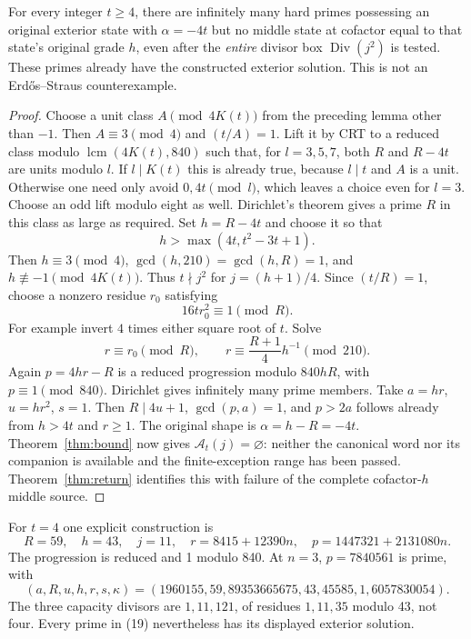 \begin{theorem}\label{thm:obstruct}
For every integer $t\ge4$, there are infinitely many hard primes possessing an
original exterior state with $\alpha=-4t$ but no middle state at cofactor equal
to that state's original grade $h$, even after the \emph{entire} divisor box
$\operatorname{Div}(j^2)$ is tested. These primes already have the constructed
exterior solution. This is not an Erd\H{o}s--Straus counterexample.
\end{theorem}
\begin{proof}
Choose a unit class $A\pmod{4K(t)}$ from the preceding lemma other than $-1$.
Then $A\equiv3\pmod4$ and $(t/A)=1$. Lift it by CRT to a reduced class modulo
$\operatorname{lcm}(4K(t),840)$ such that, for $l=3,5,7$, both $R$ and
$R-4t$ are units modulo $l$. If $l\mid K(t)$ this is already true, because
$l\mid t$ and $A$ is a unit. Otherwise one need only avoid $0,4t\pmod l$,
which leaves a choice even for $l=3$. Choose an odd lift modulo eight as well.
Dirichlet's theorem gives a prime $R$ in this class as large as required.
Set $h=R-4t$ and choose it so that
\[
 h>\max(4t,t^2-3t+1).
\]
Then $h\equiv3\pmod4$, $\gcd(h,210)=\gcd(h,R)=1$, and
$h\not\equiv-1\pmod{4K(t)}$. Thus $t\nmid j^2$ for $j=(h+1)/4$.
Since $(t/R)=1$, choose a nonzero residue $r_0$ satisfying
\[
 16tr_0^2\equiv1\pmod R.
\]
For example invert $4$ times either square root of $t$. Solve
\[
 r\equiv r_0\pmod R,\qquad
 r\equiv\frac{R+1}{4}h^{-1}\pmod{210}.
\]
Again $p=4hr-R$ is a reduced progression modulo $840hR$, with $p\equiv1\pmod{840}$.
Dirichlet gives infinitely many prime members. Take $a=hr$, $u=hr^2$, $s=1$.
Then $R\mid4u+1$, $\gcd(p,a)=1$, and $p>2a$ follows already from $h>4t$ and
$r\ge1$. The original shape is $\alpha=h-R=-4t$.
Theorem~\ref{thm:bound} now gives $\mathcal A_t(j)=\varnothing$: neither the
canonical word nor its companion is available and the finite-exception range
has been passed. Theorem~\ref{thm:return} identifies this with failure of the
complete cofactor-$h$ middle source.
\end{proof}

For $t=4$ one explicit construction is
\[
 R=59,\quad h=43,\quad j=11,\quad
 r=8415+12390n,\quad
 \boxed{p=1447321+2131080n.}                              \tag{19}
\]
The progression is reduced and 1 modulo 840. At $n=3$, $p=7840561$ is prime,
with
\[
 (a,R,u,h,r,s,\kappa)
 =(1960155,59,89353665675,43,45585,1,6057830054).
\]
The three capacity divisors are $1,11,121$, of residues $1,11,35$ modulo 43,
not four. Every prime in (19) nevertheless has its displayed exterior solution.


